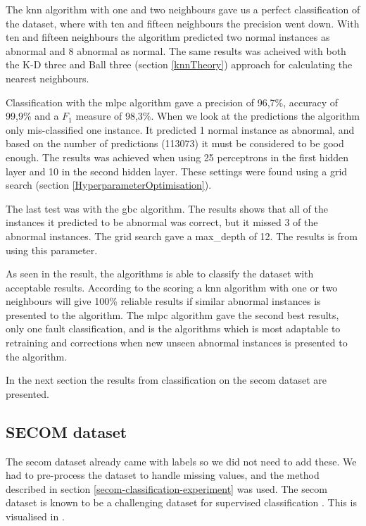 \documentclass[english, a4paper]{report}
\begin{document}
{{{            The \gls{knn} algorithm with one and two neighbours gave us a perfect classification of the dataset, where with ten and fifteen neighbours the precision went down. With ten and fifteen neighbours the algorithm predicted two normal instances as abnormal and 8 abnormal as normal. The same results was acheived with both the K-D three and Ball three (section \ref{knnTheory}) approach for calculating the nearest neighbours.
            \par
            Classification with the \gls{mlpc} algorithm gave a precision of 96,7\%, accuracy of 99,9\% and a $F_1$ measure of 98,3\%. When we look at the predictions the algorithm only mis-classified one instance. It predicted 1 normal instance as abnormal, and based on the number of predictions (113073) it must be considered to be good enough. The results was achieved when using 25 perceptrons in the first hidden layer and 10 in the second hidden layer. These settings were found using a grid search (section \ref{HyperparameterOptimisation}). 
            \par
            The last test was with the \gls{gbc} algorithm. The results shows that all of the instances it predicted to be abnormal was correct, but it missed 3 of the abnormal instances. The grid search gave a max\_depth of 12. The results is from using this parameter.
            \par
            As seen in the result, the algorithms is able to classify the dataset with acceptable results. According to the scoring a \gls{knn} algorithm with one or two neighbours will give 100\% reliable results if similar abnormal instances is presented to the algorithm. The \gls{mlpc} algorithm gave the second best results, only one fault classification, and is the algorithms which is most adaptable to retraining and corrections when new unseen abnormal instances is presented to the algorithm.
            \par 
            In the next section the results from classification on the \gls{secom} dataset are presented.
        }
        
        \subsection{SECOM dataset}
        {
            The \gls{secom} dataset already came with labels so we did not need to add these. We had to pre-process the dataset to handle missing values, and the method described in section \ref{secom-classification-experiment} was used. The \gls{secom} dataset is known to be a challenging dataset for supervised classification \cite{supervisedMLsecom}. This is visualised in .
            
}}}
\end{document}
